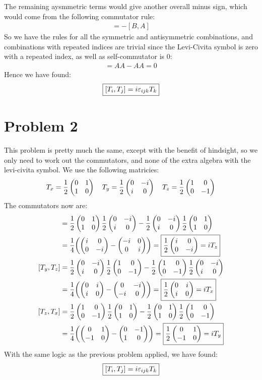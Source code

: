 \documentclass[12pt]{article}
\newcommand{\px}{\frac{1}{2}\pmqty{0&1\\1&0}}
\newcommand{\py}{\frac{1}{2}\pmqty{0&-i\\i&0}}
\newcommand{\pz}{\frac{1}{2}\pmqty{1&0\\0&-1}}
\begin{document}
The remaining aysmmetric terms would give another overall minus sign, which would come from the following commutator rule:
\begin{align*}
  [A,B]=-[B,A]
\end{align*}
So we have the rules for all the symmetric and antisymmetric combinations, and combinations with repeated indices are trivial since the Levi-Civita symbol is zero with a repeated index, as well as self-commutator is 0:
\begin{align*}
  [A,A]=AA-AA=0
\end{align*}
Hence we have found:
\begin{align*}
  \boxed{\comm{T_i}{T_j}=i\varepsilon_{ijk}T_k}
\end{align*}
\section*{Problem 2}
This problem is pretty much the same, except with the benefit of hindsight, so we only need to work out the commutators, and none of the extra algebra with the levi-civita symbol. We use the following matricies:
\begin{align*}
  T_x=\px\quad T_y=\py\quad T_z=\pz
\end{align*}
The commutators now are:
\begin{align*}
  [T_x,T_y]&=\px\py-\py\px\\
  &=\frac{1}{4}\qty(\pmqty{i&0\\0&-i}-\pmqty{-i&0\\0&i})
  =\boxed{\frac{1}{2}\pmqty{i&0\\0&-i}=iT_z}\\
  [T_y,T_z]&=\py\pz-\pz\py\\
  &=\frac{1}{4}\qty(\pmqty{0&i\\i&0}-\pmqty{0&-i\\-i&0})
  =\boxed{\frac{1}{2}\pmqty{0&i\\i&0}=iT_x}\\
  [T_z,T_x]&=\pz\px-\px\pz\\
  &=\frac{1}{4}\qty(\pmqty{0&1\\-1&0}-\pmqty{0&-1\\1&0})
  =\boxed{\frac{1}{2}\pmqty{0&1\\-1&0}=iT_y}\\
\end{align*}
With the same logic as the previous problem applied, we have found:
\begin{align*}
  \boxed{\comm{T_i}{T_j}=i\varepsilon_{ijk}T_k}
\end{align*}
\end{document}
